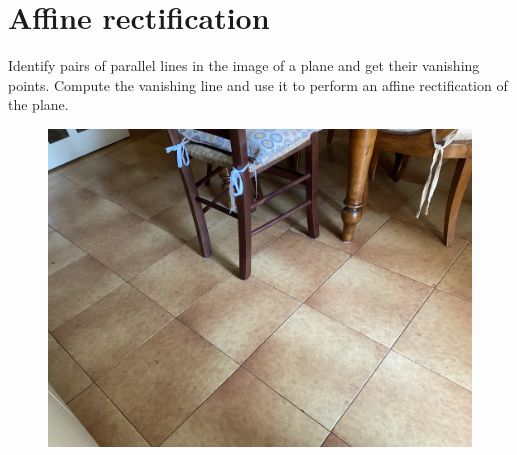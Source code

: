 \documentclass[12pt, a4paper]{report}
\newtheorem[style=M,bodystyle=\normalfont]{theorem}{Theorem}
\newtheorem[style=M,bodystyle=\normalfont]{corollary}{Corollary}
\newtheorem[style=M,bodystyle=\normalfont]{lemma}{Lemma}
\newtheorem[style=M,bodystyle=\normalfont]{definition}{Definition}
\begin{document}
    \section{Affine rectification}
        Identify pairs of parallel lines in the image of a plane and get their vanishing points. Compute the vanishing line and use it to perform an affine rectification of 
        the plane.
        \begin{figure}[H]
            \centering
            \includegraphics[width=0.75\linewidth]{images/floor.png}
        \end{figure}
\end{document}
